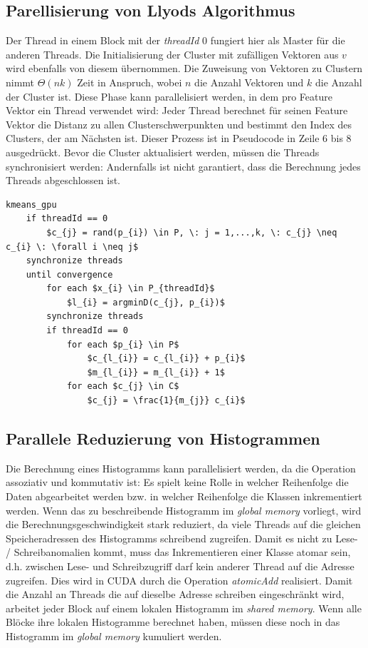 \subsection{Parellisierung von Llyods Algorithmus}

Der Thread in einem Block mit der \textit{threadId} 0 fungiert hier als Master für die anderen Threads. Die Initialisierung der Cluster mit zufälligen Vektoren aus $v$ wird ebenfalls von diesem übernommen. Die Zuweisung von Vektoren zu Clustern nimmt $\Theta(nk)$ Zeit in Anspruch, wobei $n$ die Anzahl Vektoren und $k$ die Anzahl der Cluster ist. Diese Phase kann parallelisiert werden, in dem pro Feature Vektor ein Thread verwendet wird: Jeder Thread berechnet für seinen Feature Vektor die Distanz zu allen Clusterschwerpunkten und bestimmt den Index des Clusters, der am Nächsten ist. Dieser Prozess ist in Pseudocode in Zeile 6 bis 8 ausgedrückt. Bevor die Cluster aktualisiert werden, müssen die Threads synchronisiert werden: Andernfalls ist nicht garantiert, dass die Berechnung jedes Threads abgeschlossen ist.

\lstset{language=C}
\begin{lstlisting}[mathescape=true]
kmeans_gpu
	if threadId == 0
		$c_{j} = rand(p_{i}) \in P, \: j = 1,...,k, \: c_{j} \neq c_{i} \: \forall i \neq j$
	synchronize threads
	until convergence
		for each $x_{i} \in P_{threadId}$
			$l_{i} = argminD(c_{j}, p_{i})$
		synchronize threads
		if threadId == 0
			for each $p_{i} \in P$
				$c_{l_{i}} = c_{l_{i}} + p_{i}$
				$m_{l_{i}} = m_{l_{i}} + 1$
			for each $c_{j} \in C$
				$c_{j} = \frac{1}{m_{j}} c_{i}$
\end{lstlisting}

\subsection{Parallele Reduzierung von Histogrammen}

Die Berechnung eines Histogramms kann parallelisiert werden, da die Operation assoziativ und kommutativ ist: Es spielt keine Rolle in welcher Reihenfolge die Daten abgearbeitet werden bzw. in welcher Reihenfolge die Klassen inkrementiert werden. Wenn das zu beschreibende Histogramm im \textit{global memory} vorliegt, wird die Berechnungsgeschwindigkeit stark reduziert, da viele Threads auf die gleichen Speicheradressen des Histogramms schreibend zugreifen. Damit es nicht zu Lese- / Schreibanomalien kommt, muss das Inkrementieren einer Klasse atomar sein, d.h. zwischen Lese- und Schreibzugriff darf kein anderer Thread auf die Adresse zugreifen. Dies wird in CUDA durch die Operation \textit{atomicAdd} realisiert. Damit die Anzahl an Threads die auf dieselbe Adresse schreiben eingeschränkt wird, arbeitet jeder Block auf einem lokalen Histogramm im \textit{shared memory}. Wenn alle Blöcke ihre lokalen Histogramme berechnet haben, müssen diese noch in das Histogramm im \textit{global memory} kumuliert werden. 

